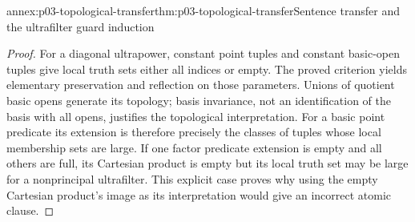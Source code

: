 \begin{annexitem}{annex:p03-topological-transfer}{thm:p03-topological-transfer}{Sentence transfer and the ultrafilter guard induction}
\begin{proof}
For a diagonal ultrapower, constant point tuples and constant basic-open
tuples give local truth sets either all indices or empty. The proved
criterion yields elementary preservation and reflection on those
parameters. Unions of quotient basic opens generate its topology; basis
invariance, not an identification of the basis with all opens, justifies
the topological interpretation. For a basic point predicate its extension
is therefore precisely the classes of tuples whose local membership sets
are large. If one factor predicate extension is empty and all others are
full, its Cartesian product is empty but its local truth set may be large
for a nonprincipal ultrafilter. This explicit case proves why using the
empty Cartesian product's image as its interpretation would give an
incorrect atomic clause.
\end{proof}
\end{annexitem}

